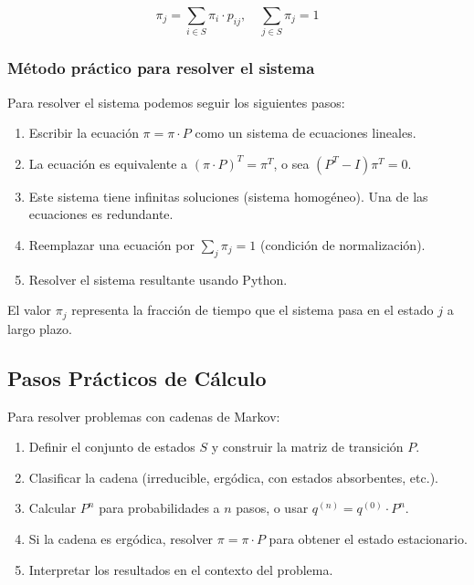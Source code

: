 \documentclass[a4paper,11pt]{article}
\begin{document}
\[\pi_j = \sum_{i \in S} \pi_i \cdot p_{ij}, \quad \sum_{j \in S} \pi_j = 1\]

\subsubsection{Método práctico para resolver el sistema}

Para resolver el sistema podemos seguir los siguientes pasos:

\begin{enumerate}
    \item Escribir la ecuación $\pi = \pi \cdot P$ como un sistema de ecuaciones lineales.
    \item La ecuación es equivalente a $(\pi \cdot P)^T = \pi^T$, o sea $(P^T - I)\pi^T = 0$.
    \item Este sistema tiene infinitas soluciones (sistema homogéneo). Una de las ecuaciones es redundante.
    \item Reemplazar una ecuación por $\sum_j \pi_j = 1$ (condición de normalización).
    \item Resolver el sistema resultante usando Python.
\end{enumerate}

\vspace{0.5em}

El valor $\pi_j$ representa la fracción de tiempo que el sistema pasa en el estado $j$ a largo plazo.

\subsection{Pasos Prácticos de Cálculo}

Para resolver problemas con cadenas de Markov:

\begin{enumerate}
    \item Definir el conjunto de estados $S$ y construir la matriz de transición $P$.
    \item Clasificar la cadena (irreducible, ergódica, con estados absorbentes, etc.).
    \item Calcular $P^n$ para probabilidades a $n$ pasos, o usar $q^{(n)} = q^{(0)} \cdot P^n$.
    \item Si la cadena es ergódica, resolver $\pi = \pi \cdot P$ para obtener el estado estacionario.
    \item Interpretar los resultados en el contexto del problema.
\end{enumerate}
\end{document}
